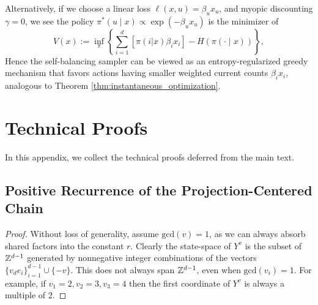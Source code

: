 \begin{subappendices}
Alternatively, if we choose a linear loss $\ell(x,u) = \beta_u x_u$, and myopic discounting $\gamma=0$, we see the policy $\pi^*(u \mid x) \propto \exp(-\beta_ux_u)$ is the minimizer of
%
\[V(x) := \inf_\pi \left\{\sum_{i=1}^d [\pi(i|x)  \beta_ix_i] - H(\pi(\cdot \mid x)) \right\},\]
%
\noindent Hence the self-balancing sampler can be viewed as an entropy-regularized greedy mechanism that favors actions having smaller weighted current counts $\beta_i x_i$, analogous to Theorem \ref{thm:instantaneous_optimization}.



\newpage
\section{Technical Proofs}
\label{appendix:proofs}



In this appendix, we collect the technical proofs deferred from the main text.

\subsection{Positive Recurrence of the Projection-Centered Chain}
\label{appendix:model_and_structural_proofs}




    \begin{proof}
        Without loss of generality, assume $\mathrm{gcd}(v) = 1$, as we can always absorb
        shared factors into the constant $r$. Clearly the state-space of $Y^v$ is
        the subset of $\mathbb{Z}^{d-1}$ generated by nonnegative integer combinations of the vectors $\{v_d e_i\}_{i=1}^{d-1} \cup \{-v\}$.
        This does not always span $\mathbb{Z}^{d-1}$, even when $\mathrm{gcd}(v_i) = 1$. For example, if $v_1 = 2, v_2 = 3, v_3 = 4$ then the first coordinate
        of $Y^v$ is always a multiple of $2$.


\end{proof}
\end{subappendices}
